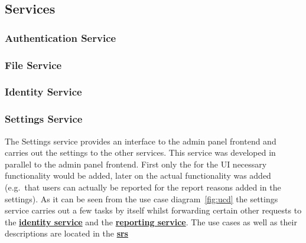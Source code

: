 \subsection{Services}

\subsubsection{Authentication Service}

\subsubsection{File Service}

\subsubsection{Identity Service}
\label{subsubsec:identitySer}

\subsubsection{Settings Service}\label{subsubsec:settingsSer}

The Settings service provides an interface to the admin panel frontend and carries out the settings to the other
services.
This service was developed in parallel to the admin panel frontend. %
First only the for the UI necessary functionality would be added, later on the actual functionality was added
(e.g.\ that users can actually be reported for the report reasons added in the settings).
As it can be seen from the use case diagram~\ref{fig:ucd} the settings service carries out a few tasks by itself whilst
forwarding certain other requests to the \hyperref[subsubsec:identitySer]{\textbf{identity service}} and the
\hyperref[subsubsec:reportingSer]{\textbf{reporting service}}.
The use cases as well as their descriptions are located in the
\hyperref[ch:software-requirements-specification-(srs)]{\textbf{\ac{srs}}}

